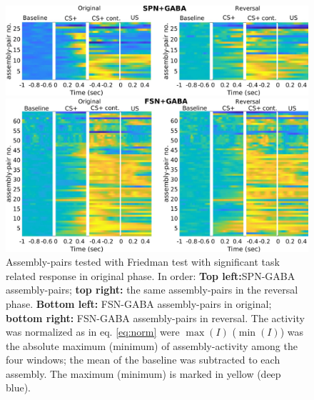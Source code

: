  \begin{figure}
     \centering
     \includegraphics[scale=0.42]{figures/HeatSPN_GABA.pdf}
     
     \vspace{1cm}
     
     \includegraphics[scale=0.42]{figures/HeatFSN_GABA.pdf}
     \caption{Assembly-pairs tested with Friedman test with significant task related response in original phase. In order: \textbf{Top left:}SPN-GABA assembly-pairs; \textbf{top right:} the same assembly-pairs in the reversal phase. \textbf{Bottom left:} FSN-GABA assembly-pairs in original; \textbf{bottom right:} FSN-GABA assembly-pairs in reversal. The activity was normalized as in eq. \ref{eq:norm} were $\max(I)$ ($\min(I)$) was the absolute maximum (minimum) of assembly-activity among the four windows; the mean of the baseline was subtracted to each assembly. The maximum (minimum) is marked in yellow (deep blue).}
     \label{fig:HeatPairsGaba}
 \end{figure}
